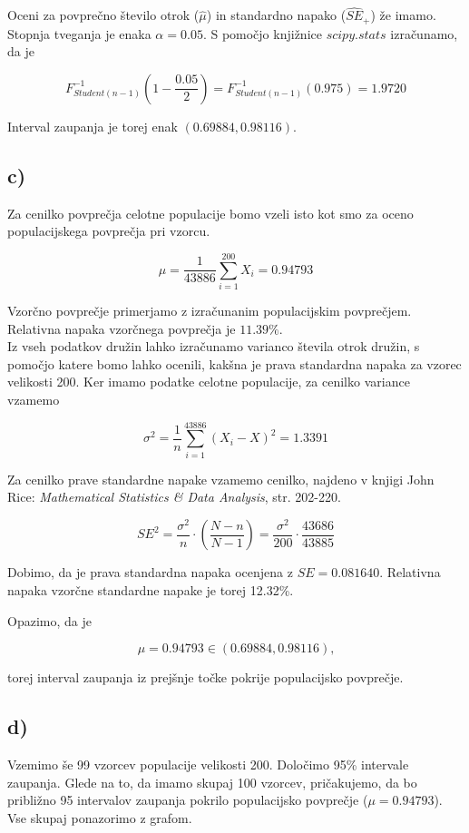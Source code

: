 \documentclass[12pt, a4paper]{article}
\begin{document}
Oceni za povprečno število otrok ($\hat{\mu}$) in standardno napako ($\hat{SE}_+$)
že imamo. Stopnja tveganja je enaka $\alpha = 0.05$. S pomočjo knjižnice $scipy.stats$ izračunamo, da je 

$$ F^{-1}_{Student(n-1)}(1 - \frac{0.05}{2}) = F^{-1}_{Student(n-1)}(0.975) = 1.9720
$$

Interval zaupanja je torej enak $(0.69884, 0.98116)$.

\subsection*{c)}

Za cenilko povprečja celotne populacije bomo vzeli isto kot smo za oceno populacijskega
povprečja pri vzorcu. 

$$ \mu = \frac{1}{43886}\sum^{200}_{i=1} X_i = 0.94793
$$

Vzorčno povprečje primerjamo z izračunanim populacijskim povprečjem. Relativna
 napaka vzorčnega povprečja je $11.39\%$. \\

Iz vseh podatkov družin lahko izračunamo varianco števila otrok družin, s pomočjo
katere bomo lahko ocenili, kakšna je prava standardna napaka za vzorec velikosti 200.
Ker imamo podatke celotne populacije, za cenilko variance vzamemo

$$ \sigma^2 = \frac{1}{n} \sum_{i=1}^{43886} (X_i - X)^2 = 1.3391
$$

Za cenilko prave standardne napake vzamemo cenilko, najdeno v knjigi John Rice:
\emph{Mathematical Statistics \& Data Analysis}, str. 202-220. 

$$ SE^2 = \frac{\sigma^2}{n} \cdot (\frac{N-n}{N-1}) = \frac{\sigma^2}{200} \cdot \frac{43686}{43885}
$$

Dobimo, da je prava standardna napaka ocenjena z $SE = 0.081640$. Relativna napaka
vzorčne standardne napake je torej 12.32\%.

Opazimo, da je

$$ \mu = 0.94793 \in (0.69884, 0.98116) \text{,}
$$

torej interval zaupanja iz prejšnje točke pokrije populacijsko povprečje.

\subsection*{d)}

Vzemimo še 99 vzorcev populacije velikosti 200. Določimo 95\% intervale zaupanja. 
Glede na to, da imamo skupaj 100
vzorcev, pričakujemo, da bo približno 95 intervalov zaupanja pokrilo populacijsko
povprečje ($\mu = 0.94793$). Vse skupaj ponazorimo z grafom.
\end{document}

